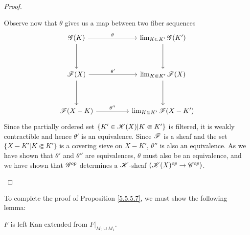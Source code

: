 \documentclass[../../thesis.tex]{subfiles}
\begin{document}
\begin{proof}
\begin{enumerate}
              Observe now that $\theta$ gives us a map between two fiber sequences
              \[\begin{tikzcd}
                      {\G(K)} && {\lim_{K\Subset K'}\G(K')} \\
                      \\
                      {\F(X)} && {\lim_{K\Subset K'}\F(X)} \\
                      \\
                      {\F(X-K)} && {\lim_{K\Subset K'}\F(X-K')}
                      \arrow["\theta", from=1-1, to=1-3]
                      \arrow["{\theta'}", from=3-1, to=3-3]
                      \arrow["{\theta''}", from=5-1, to=5-3]
                      \arrow[from=1-1, to=3-1]
                      \arrow[from=3-1, to=5-1]
                      \arrow[from=1-3, to=3-3]
                      \arrow[from=3-3, to=5-3]
                  \end{tikzcd}\]
              Since the partially ordered set $\{K'\in \mathscr{K}(X) | K\Subset K'\}$ is filtered, it is weakly contractible and hence $\theta'$ is an equivalence.
              Since $\mathscr{F}$ is a sheaf and the set $\{X-K' | K \Subset K'\}$ is a covering sieve on $X-K'$, $\theta''$ is also an equivalence.
              As we have shown that $\theta'$ and $\theta''$ are equivalences, $\theta$ must also be an equivalence, and we have shown that $\mathscr{G}^{op}$ determines a $\mathscr{K}$-sheaf $(\mathscr{K}(X)^{op} \to \mathscr{C}^{op})$.
    \end{enumerate}
\end{proof}
To complete the proof of Proposition \ref{5.5.5.7}, we must show the following lemma:
\begin{lemma}
    $F$ is left Kan extended from $F|_{M_0\cup M_1}$.
\end{lemma}
\end{document}
